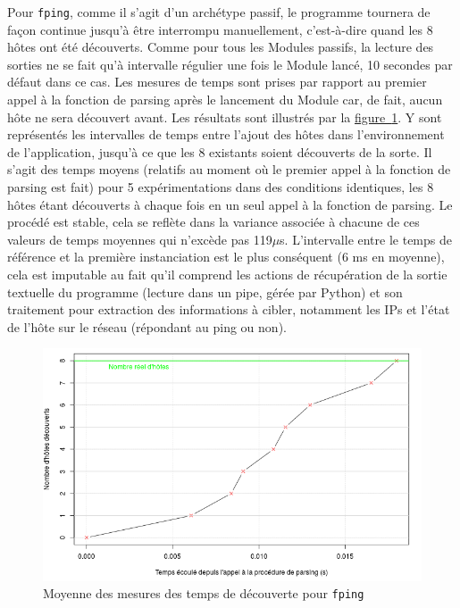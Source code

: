 \documentclass[]{article}
\newcommand{\wordlink}[2]{\hyperref[#1]{#2~\ref{#1}}}
\begin{document}
\par Pour \texttt{fping}, comme il s'agit d'un archétype passif, le programme tournera de façon continue jusqu'à être interrompu manuellement, c'est-à-dire quand les 8 hôtes ont été découverts. Comme pour tous les Modules passifs, la lecture des sorties ne se fait qu'à intervalle régulier une fois le Module lancé, 10 secondes par défaut dans ce cas. Les mesures de temps sont prises par rapport au premier appel à la fonction de parsing après le lancement du Module car, de fait, aucun hôte ne sera découvert avant. Les résultats sont illustrés par la \wordlink{fpingmean}{figure}. Y sont représentés les intervalles de temps entre l'ajout des hôtes dans l'environnement de l'application, jusqu'à ce que les 8 existants soient découverts de la sorte. Il s'agit des temps moyens (relatifs au moment où le premier appel à la fonction de parsing est fait) pour 5 expérimentations dans des conditions identiques, les 8 hôtes étant découverts à chaque fois en un seul appel à la fonction de parsing. Le procédé est stable, cela se reflète dans la variance associée à chacune de ces valeurs de temps moyennes qui n'excède pas 119$\mu$s. L'intervalle entre le temps de référence et la première instanciation est le plus conséquent (6 ms en moyenne), cela est imputable au fait qu'il comprend les actions de récupération de la sortie textuelle du programme (lecture dans un pipe, gérée par Python) et son traitement pour extraction des informations à cibler, notamment les IPs et l'état de l'hôte sur le réseau (répondant au ping ou non).

\begin{figure}[!ht]
\centering
     \includegraphics[width=0.7\linewidth]{fpingmean}
     \caption{Moyenne des mesures des temps de découverte pour \texttt{fping}}
     \label{fpingmean}
\end{figure}

\vspace{0.1cm}
\end{document}
